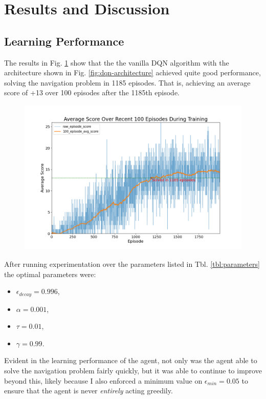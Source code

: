 \documentclass[11pt]{article}
\begin{document}
\section{Results and Discussion}

\subsection{Learning Performance}

The results in Fig. \ref{fig:dqn-results} show that the the vanilla DQN
algorithm with the architecture shown in Fig. \ref{fig:dqn-architecture} achieved 
quite good performance, solving the navigation problem in 1185 episodes. That is, 
achieving an average score of +13 over 100 episodes after the 1185th episode.

\FloatBarrier

\begin{figure}[!ht]
	\centering
	\includegraphics[width=0.8\linewidth]{images/dqn-results.png}
	\caption{}
	\label{fig:dqn-results}
\end{figure}

\FloatBarrier

After running experimentation over the parameters listed in Tbl. \ref{tbl:parameters} 
the optimal parameters were:
\begin{itemize}
	\item $\epsilon_{decay} = 0.996$,
	\item $\alpha = 0.001$,
	\item $\tau = 0.01$,
	\item $\gamma = 0.99$.
\end{itemize}

Evident in the learning performance of the agent, not only was the agent able to 
solve the navigation problem fairly quickly, but it was able to continue to improve 
beyond this, likely because I also enforced a minimum value on $\epsilon_{min} = 0.05$ 
to ensure that the agent is never \textit{entirely} acting greedily.
\end{document}
